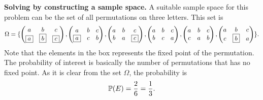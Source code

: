 \begin{solution}
	\textbf{Solving by constructing a sample space.} A suitable sample space for this problem can be the set of all permutations on three letters. This set is
	\[ \Omega = 
	\{\begin{pmatrix}
			a & b & c \\
			\boxed{a} & \boxed{b} & \boxed{c}
		\end{pmatrix},
		\begin{pmatrix}
			a & b & c \\
			\boxed{a} & c & b
		\end{pmatrix},
		\begin{pmatrix}
			a & b & c \\
			b & a & \boxed{c}
		\end{pmatrix},
		\begin{pmatrix}
			a & b & c \\
			b & c & a
		\end{pmatrix},
		\begin{pmatrix}
			a & b & c \\
			c & a & b
		\end{pmatrix},
		\begin{pmatrix}
			a & b & c \\
			c & \boxed{b} & a
	\end{pmatrix}\}.
	\]
	Note that the elements in the box represents the fixed point of the permutation. The probability of interest is basically the number of permutations that has no fixed point. As it is clear from the set $\Omega$, the probability is
	\[ \mathbb{P}(E) = \frac{2}{6} = \frac{1}{3}. \]
\end{solution}

